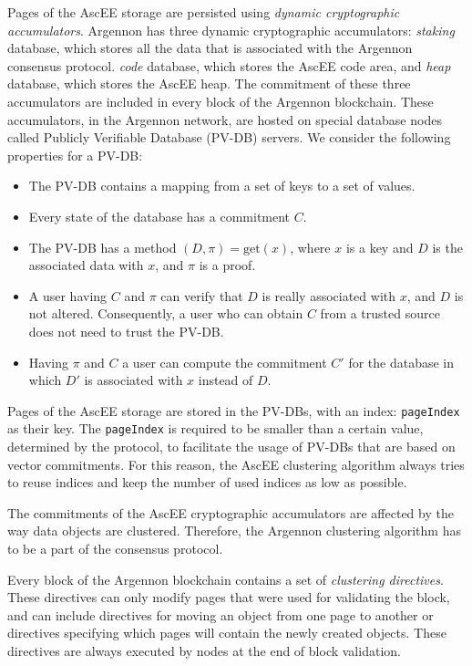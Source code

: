 Pages of the AscEE storage are persisted using \emph{dynamic cryptographic accumulators}. Argennon
has three dynamic cryptographic accumulators: \emph{staking} database, which stores all the data that is associated with
the Argennon consensus protocol. \emph{code} database, which stores the AscEE code area, and \emph{heap} database,
which stores the AscEE heap. The commitment of these three accumulators are included in every block of the Argennon
blockchain. These accumulators, in the Argennon network, are hosted on special database nodes called Publicly
Verifiable Database (PV-DB) servers.
We consider the following properties for a PV-DB:
\begin{itemize}
    \item The PV-DB contains a mapping from a set of keys to a set of values.
    \item Every state of the database has a commitment \(C\).
    \item The PV-DB has a method \((D, \pi) = \text{get}(x)\), where \(x\) is a key and \(D\) is the associated data
    with \(x\), and \(\pi\) is a proof.
    \item A user having \(C\) and \(\pi\) can verify that \(D\) is really associated with \(x\), and \(D\) is not
    altered. Consequently, a user who can obtain \(C\) from a trusted source does not need to trust the PV-DB\@.
    \item Having \(\pi\) and \(C\) a user can compute the commitment \(C'\) for the database in which \(D'\) is
    associated with \(x\) instead of \(D\).
\end{itemize}

Pages of the AscEE storage are stored in the PV-DBs, with an index: \texttt{pageIndex} as their key.
The \texttt{pageIndex} is required to be smaller than a certain value, determined by the
protocol, to facilitate the usage of PV-DBs that are based on vector commitments.
For this reason, the AscEE clustering algorithm always tries to reuse indices and keep the number of used indices
as low as possible.

The commitments of the AscEE cryptographic accumulators are affected by the way data objects are clustered. Therefore,
the Argennon clustering algorithm has to be a part of the consensus protocol.

Every block of the Argennon blockchain contains a set of \emph{clustering directives}. These directives
can only modify pages that were used for validating the block, and can
include directives for moving an object from one page to another or directives specifying which pages will contain
the newly created objects. These directives are always executed by nodes at the end of block validation.

